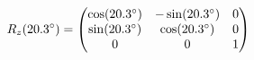 \documentclass[preview]{standalone}
\begin{document}
\begin{align*}
\special{dvisvgm:raw <g id='unique000'>}R_z(20.3^\circ) = \begin{pmatrix} \cos(20.3^\circ) & -\sin(20.3^\circ) & 0 \\ \sin(20.3^\circ) & \cos(20.3^\circ) & 0 \\ 0 & 0 & 1 \end{pmatrix}\special{dvisvgm:raw </g>}
\end{align*}
\end{document}
